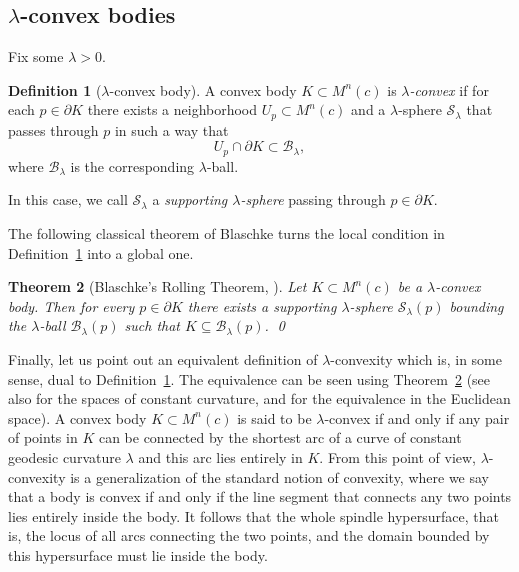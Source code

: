 \documentclass[12pt]{amsart}
\newcommand{\Ss}{\mathcal{S}}
\newcommand{\Bb}{\mathcal{B}}
\theoremstyle{theorem}
\newtheorem{theorem}{Theorem}[section]
\theoremstyle{Intro}
\theoremstyle{definition}
\newtheorem{definition}[theorem]{Definition}
\theoremstyle{remark}
\theoremstyle{claim}
\numberwithin{equation}{section}
\begin{document}
\subsection{$\lambda$-convex bodies}	
\label{SSec:LConv}
Fix some $\lambda>0$. 

\begin{definition}[$\lambda$-convex body]
\label{Def:LambdaConvex}
A convex body $K \subset M^n(c)$ is \emph{$\lambda$-convex} if for each $p \in \partial K$ there exists a neighborhood $U_p \subset M^n(c)$ and a $\lambda$-sphere $\Ss_\lambda$ that passes through $p$ in such a way that
\[
U_p \cap \partial K \subset \Bb_\lambda,
\]
where $\Bb_\lambda$ is the corresponding $\lambda$-ball.
\end{definition}

In this case, we call $\Ss_\lambda$ a \emph{supporting $\lambda$-sphere} passing through $p \in \partial K$.




The following classical theorem of Blaschke turns the local condition in Definition~\ref{Def:LambdaConvex} into a global one. 





\begin{theorem}[Blaschke's Rolling Theorem, \cite{Bla56,DrBla}]
\label{Thm:Bla}
Let $K \subset M^n(c)$ be a $\lambda$-convex body. Then for every $p \in \partial K$ there exists a supporting $\lambda$-sphere $\Ss_{\lambda}(p)$ bounding the $\lambda$-ball $\Bb_\lambda(p)$ such that $K  \subseteq  \Bb_{\lambda}(p)$. \qed
\end{theorem}


Finally, let us point out an equivalent definition of $\lambda$-convexity which is, in some sense, dual to Definition~\ref{Def:LambdaConvex}. The equivalence can be seen using Theorem~\ref{Thm:Bla} (see also \cite[Lemma 7]{BorDr13} for the spaces of constant curvature, and \cite[Corollary 3.4]{BLNP} for the equivalence in the Euclidean space). A convex body $K \subset M^n(c)$ is said to be $\lambda$-convex if and only if any pair of points in $K$ can be connected by the shortest arc of a curve of constant geodesic curvature $\lambda$ and this arc lies entirely in $K$. From this point of view, $\lambda$-convexity is a generalization of the standard notion of convexity, where we say that a body is convex if and only if the line segment that connects any two points lies entirely inside the body.   
It follows that the whole spindle hypersurface, that is, the locus of all arcs connecting the two points, and the domain bounded by this hypersurface must lie inside the body. 
\end{document}

